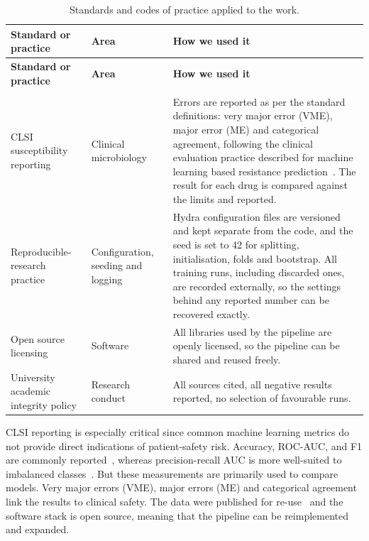{\small\setlength{\tabcolsep}{5pt}
\begin{longtable}{|>{\raggedright\arraybackslash}p{3.3cm}|>{\raggedright\arraybackslash}p{3.2cm}|>{\raggedright\arraybackslash}p{7.4cm}|}
\caption{Standards and codes of practice applied to the work.}
\label{tab:standards}\\
\hline
\textbf{Standard or practice} & \textbf{Area} & \textbf{How we used it} \\
\hline
\endfirsthead
\hline
\textbf{Standard or practice} & \textbf{Area} & \textbf{How we used it} \\
\hline
\endhead
\hline
\multicolumn{3}{r}{\footnotesize\textit{Continued on the next page}}\\
\endfoot
\hline
\endlastfoot
CLSI susceptibility reporting & Clinical microbiology &
Errors are reported as per the standard definitions: very major error (VME), major error (ME)
and categorical agreement, following the clinical evaluation practice described for machine
learning based resistance prediction~\cite{Kim2022, Hu2024}. The result for each drug is
compared against the limits and reported. \\
\hline
Reproducible-research practice & Configuration, seeding and logging &
Hydra configuration files are versioned and kept separate from the code, and the seed is set to
42 for splitting, initialisation, folds and bootstrap. All training runs, including discarded
ones, are recorded externally, so the settings behind any reported number can be recovered
exactly. \\
\hline
Open source licensing & Software &
All libraries used by the pipeline are openly licensed, so the pipeline can be shared and
reused freely. \\
\hline
University academic integrity policy & Research conduct &
All sources cited, all negative results reported, no selection of favourable runs. \\
\end{longtable}}

CLSI reporting is especially critical since common machine learning metrics do not provide
direct indications of patient-safety risk. Accuracy, ROC-AUC, and F1 are commonly
reported~\cite{Hu2024}, whereas precision-recall AUC is more well-suited to imbalanced
classes~\cite{saito2015, davis2006}. But these measurements are primarily used to compare
models. Very major errors (VME), major errors (ME) and categorical agreement link the results
to clinical safety. The data were published for re-use~\cite{arcadia2024} and the software stack is open
source, meaning that the pipeline can be reimplemented and expanded.

